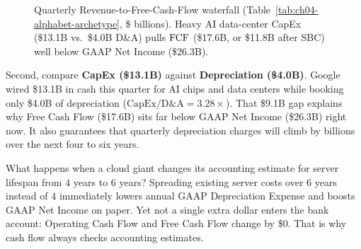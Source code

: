 \begin{figure}[htbp]
\caption{Quarterly Revenue-to-Free-Cash-Flow waterfall (Table~\ref{tab:ch04-alphabet-archetype}, \$ billions). Heavy AI data-center CapEx (\$13.1B vs.\ \$4.0B D\&A) pulls $\operatorname{FCF}$ (\$17.6B, or \$11.8B after SBC) well below GAAP Net Income (\$26.3B).}
\label{fig:ch04-hyperscaler-bridge}
\end{figure}

Second, compare \textbf{CapEx (\$13.1B)} against \textbf{Depreciation (\$4.0B)}. Google wired \$13.1B in cash this quarter for AI chips and data centers while booking only \$4.0B of depreciation ($\text{CapEx} / \text{D\&A} = 3.28\times$). That \$9.1B gap explains why Free Cash Flow (\$17.6B) sits far below GAAP Net Income (\$26.3B) right now. It also guarantees that quarterly depreciation charges will climb by billions over the next four to six years.

\begin{happeningbox}
What happens when a cloud giant changes its accounting estimate for server lifespan from $4$ years to $6$ years? Spreading existing server costs over $6$ years instead of $4$ immediately lowers annual GAAP Depreciation Expense and boosts GAAP Net Income on paper. Yet not a single extra dollar enters the bank account: Operating Cash Flow and Free Cash Flow change by \$0. That is why cash flow always checks accounting estimates.
\end{happeningbox}

